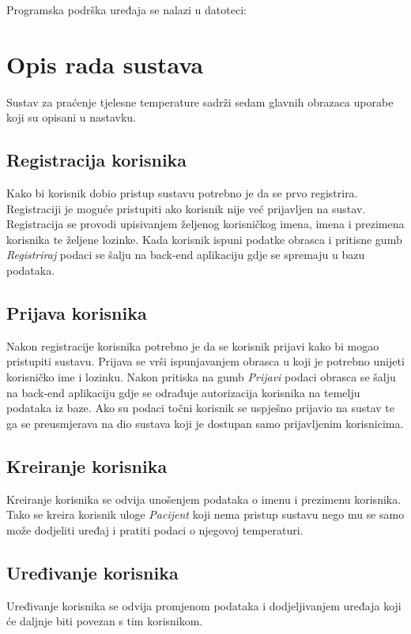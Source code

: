\documentclass[times, utf8, diplomski]{fer}
\begin{document}
Programska podrška uređaja se nalazi u datoteci: 


\section{Opis rada sustava}
Sustav za praćenje tjelesne temperature sadrži sedam glavnih obrazaca uporabe koji su opisani u nastavku.

\subsection{Registracija korisnika}
Kako bi korisnik dobio pristup sustavu potrebno je da se prvo registrira. Registraciji je moguće pristupiti ako korisnik nije već prijavljen na sustav. Registracija se provodi upisivanjem željenog korisničkog imena, imena i prezimena korisnika te željene lozinke. Kada korisnik ispuni podatke obrasca i pritisne gumb \emph{Registriraj} podaci se šalju na back-end aplikaciju gdje se spremaju u bazu podataka.

\subsection{Prijava korisnika}
Nakon registracije korisnika potrebno je da se korisnik prijavi kako bi mogao pristupiti sustavu. Prijava se vrši ispunjavanjem obrasca u koji je potrebno unijeti korisničko ime i lozinku. Nakon pritiska na gumb \emph{Prijavi} podaci obrasca se šalju na back-end aplikaciju gdje se odrađuje autorizacija korisnika na temelju podataka iz baze. Ako su podaci točni korisnik se uspješno prijavio na sustav te ga se preusmjerava na dio sustava koji je dostupan samo prijavljenim korisnicima. 

\subsection{Kreiranje korisnika}
Kreiranje korisnika se odvija unošenjem podataka o imenu i prezimenu korisnika. Tako se kreira korisnik uloge \emph{Pacijent} koji nema pristup sustavu nego mu se samo može dodjeliti uređaj i pratiti podaci o njegovoj temperaturi.

\subsection{Uređivanje korisnika}
Uređivanje korisnika se odvija promjenom podataka i dodjeljivanjem uređaja koji će daljnje biti povezan s tim korisnikom.
\end{document}
